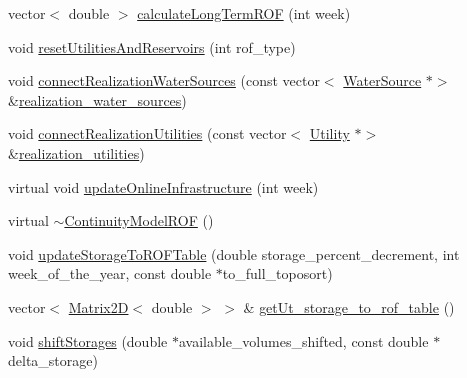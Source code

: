 \begin{DoxyCompactItemize}
\item 
vector$<$ double $>$ \mbox{\hyperlink{classContinuityModelROF_ab6e6125e6ea195d7c29a0c6d2203d51c_ab6e6125e6ea195d7c29a0c6d2203d51c}{calculate\+Long\+Term\+R\+OF}} (int week)
\item 
void \mbox{\hyperlink{classContinuityModelROF_acd72d71a29cef49c4de3d111378b76c7_acd72d71a29cef49c4de3d111378b76c7}{reset\+Utilities\+And\+Reservoirs}} (int rof\+\_\+type)
\item 
void \mbox{\hyperlink{classContinuityModelROF_a0c12b5dad97c3783361baad7e53a2634_a0c12b5dad97c3783361baad7e53a2634}{connect\+Realization\+Water\+Sources}} (const vector$<$ \mbox{\hyperlink{classWaterSource}{Water\+Source}} $\ast$$>$ \&\mbox{\hyperlink{classContinuityModelROF_a77048d247b8d1f70fbdd31559b4d3337_a77048d247b8d1f70fbdd31559b4d3337}{realization\+\_\+water\+\_\+sources}})
\item 
void \mbox{\hyperlink{classContinuityModelROF_abc16c650a854b60dfc42ab2d32ef4b0c_abc16c650a854b60dfc42ab2d32ef4b0c}{connect\+Realization\+Utilities}} (const vector$<$ \mbox{\hyperlink{classUtility}{Utility}} $\ast$$>$ \&\mbox{\hyperlink{classContinuityModelROF_a75c6823d8dd37f274ee91ce158088dc4_a75c6823d8dd37f274ee91ce158088dc4}{realization\+\_\+utilities}})
\item 
virtual void \mbox{\hyperlink{classContinuityModelROF_af09f22c4fd69db45d3c8962713801287_af09f22c4fd69db45d3c8962713801287}{update\+Online\+Infrastructure}} (int week)
\item 
virtual \mbox{\hyperlink{classContinuityModelROF_a0098bd7efa9e57a7ff0efc4c9b5aa340_a0098bd7efa9e57a7ff0efc4c9b5aa340}{$\sim$\+Continuity\+Model\+R\+OF}} ()
\item 
void \mbox{\hyperlink{classContinuityModelROF_a28834584763c3aa27a6f0917aa68926f_a28834584763c3aa27a6f0917aa68926f}{update\+Storage\+To\+R\+O\+F\+Table}} (double storage\+\_\+percent\+\_\+decrement, int week\+\_\+of\+\_\+the\+\_\+year, const double $\ast$to\+\_\+full\+\_\+toposort)
\item 
vector$<$ \mbox{\hyperlink{classMatrix2D}{Matrix2D}}$<$ double $>$ $>$ \& \mbox{\hyperlink{classContinuityModelROF_ab4a793f312b693d98c80e4b9545a8bb5_ab4a793f312b693d98c80e4b9545a8bb5}{get\+Ut\+\_\+storage\+\_\+to\+\_\+rof\+\_\+table}} ()
\item 
void \mbox{\hyperlink{classContinuityModelROF_a4f2b25687bcdeb4a88e22397c84789de_a4f2b25687bcdeb4a88e22397c84789de}{shift\+Storages}} (double $\ast$available\+\_\+volumes\+\_\+shifted, const double $\ast$delta\+\_\+storage)
\item 

\end{DoxyCompactItemize}
